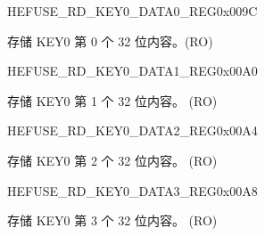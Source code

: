 \begin{register}{H}{EFUSE\_RD\_KEY0\_DATA0\_REG}{0x009C}\label{regdesc:EFUSERDKEY0DATA0REG}
%
\regnewline%
\begin{regdesc}\begin{reglist}
\label{fielddesc:EFUSEKEY0DATA0}\item [EFUSE\_KEY0\_DATA0] 存储 KEY0 第 0 个 32 位内容。(RO)
\end{reglist}\end{regdesc}
\end{register}


\begin{register}{H}{EFUSE\_RD\_KEY0\_DATA1\_REG}{0x00A0}\label{regdesc:EFUSERDKEY0DATA1REG}
%
\regnewline%
\begin{regdesc}\begin{reglist}
\label{fielddesc:EFUSEKEY0DATA1}\item [EFUSE\_KEY0\_DATA1] 存储 KEY0 第 1 个 32 位内容。 (RO)
\end{reglist}\end{regdesc}
\end{register}


\begin{register}{H}{EFUSE\_RD\_KEY0\_DATA2\_REG}{0x00A4}\label{regdesc:EFUSERDKEY0DATA2REG}
%
\regnewline%
\begin{regdesc}\begin{reglist}
\label{fielddesc:EFUSEKEY0DATA2}\item [EFUSE\_KEY0\_DATA2] 存储 KEY0 第 2 个 32 位内容。 (RO)
\end{reglist}\end{regdesc}
\end{register}


\begin{register}{H}{EFUSE\_RD\_KEY0\_DATA3\_REG}{0x00A8}\label{regdesc:EFUSERDKEY0DATA3REG}
%
\regnewline%
\begin{regdesc}\begin{reglist}
\label{fielddesc:EFUSEKEY0DATA3}\item [EFUSE\_KEY0\_DATA3] 存储 KEY0 第 3 个 32 位内容。 (RO)
\end{reglist}\end{regdesc}
\end{register}


